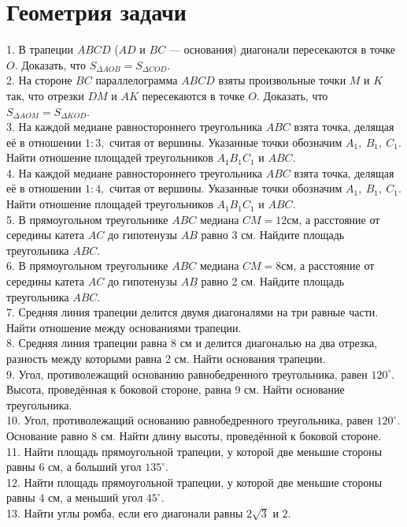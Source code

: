 \documentclass[12pt]{article}
\begin{document}
\section{Геометрия задачи}
1. В трапеции $ABCD$ ($AD$ и $BC$ --- основания) диагонали пересекаются в точке $O.$ Доказать, что $S_{\Delta AOB}=S_{\Delta COD}.$\\
2. На стороне $BC$ параллелограмма $ABCD$ взяты произвольные точки $M$ и $K$ так, что отрезки $DM$ и $AK$ пересекаются в точке $O.$ Доказать, что $S_{\Delta AOM}=S_{\Delta KOD}.$\\
3. На каждой медиане равностороннего треугольника $ABC$ взята точка, делящая её в отношении $1:3,$ считая от вершины. Указанные точки обозначим $A_1,\ B_1,\ C_1.$ Найти отношение площадей треугольников $A_1B_1C_1$ и $ABC.$\\
4. На каждой медиане равностороннего треугольника $ABC$ взята точка, делящая её в отношении $1:4,$ считая от вершины. Указанные точки обозначим $A_1,\ B_1,\ C_1.$ Найти отношение площадей треугольников $A_1B_1C_1$ и $ABC.$\\
5. В прямоугольном треугольнике $ABC$ медиана $CM=12$см, а расстояние от середины катета $AC$ до гипотенузы $AB$ равно 3 см. Найдите площадь треугольника $ABC.$\\
6. В прямоугольном треугольнике $ABC$ медиана $CM=8$см, а расстояние от середины катета $AC$ до гипотенузы $AB$ равно 2 см. Найдите площадь треугольника $ABC.$\\
7. Средняя линия трапеции делится двумя диагоналями на три равные части. Найти отношение между основаниями трапеции.\\
8. Средняя линия трапеции равна 8 см и делится диагональю на два отрезка, разность между которыми равна 2 см. Найти основания трапеции.\\
9. Угол, противолежащий основанию равнобедренного треугольника, равен $120^\circ.$ Высота, проведённая к боковой стороне, равна 9 см. Найти основание треугольника.\\
10. Угол, противолежащий основанию равнобедренного треугольника, равен $120^\circ.$ Основание равно 8 см. Найти длину высоты, проведённой к боковой стороне.\\
11. Найти площадь прямоугольной трапеции, у которой две меньшие стороны равны 6 см, а больший угол $135^\circ.$\\
12. Найти площадь прямоугольной трапеции, у которой две меньшие стороны равны 4 см, а меньший угол $45^\circ.$\\
13. Найти углы ромба, если его диагонали равны $2\sqrt{3}$ и $2.$\\
\end{document}
